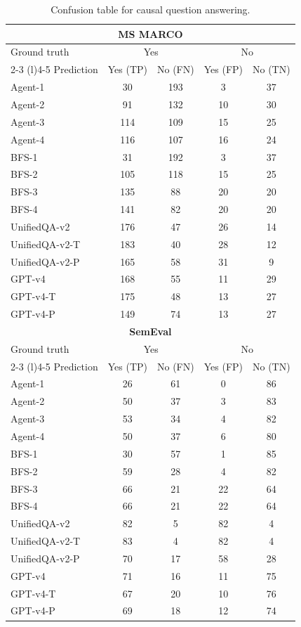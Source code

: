 \begin{table}
\caption{Confusion table for causal question answering.}
\label{table-confusion-table}
\setlength{\tabcolsep}{7pt}
\begin{tabular}{@{}lcccc@{}}
\toprule
\multicolumn{5}{c}{\textbf{MS MARCO}}  \\ \midrule
Ground truth & \multicolumn{2}{c}{Yes} & \multicolumn{2}{c}{No} \\ \cmidrule(lr){2-3} \cmidrule(l){4-5}
Prediction & Yes (TP) & No (FN) & Yes (FP) & No (TN)\\ \midrule
Agent-1         &  30 & 193 &  3 & 37 \\
Agent-2	        &  91 & 132 & 10 & 30 \\
Agent-3	        & 114 & 109 & 15 & 25 \\
Agent-4	        & 116 & 107 & 16 & 24 \\
\midrule
BFS-1           &  31 &  192 &  3 & 37 \\
BFS-2           & 105 &  118 & 15 & 25 \\
BFS-3           & 135 &   88 & 20 & 20 \\
BFS-4           & 141 &   82 & 20 & 20 \\
\midrule
UnifiedQA-v2	& 176 &	 47 & 26 & 14 \\
UnifiedQA-v2-T	& 183 &  40 & 28 & 12 \\
UnifiedQA-v2-P	& 165 &  58 & 31 &  9 \\
GPT-v4          & 168 &  55 & 11 & 29 \\ 
GPT-v4-T        & 175 &  48 & 13 & 27 \\
GPT-v4-P        & 149 &  74 & 13 & 27 \\
\bottomrule
\toprule
\multicolumn{5}{c}{\textbf{SemEval}}\\
\midrule
Ground truth	& \multicolumn{2}{c}{Yes} & \multicolumn{2}{c}{No} \\ \cmidrule(lr){2-3} \cmidrule(l){4-5}
Prediction	& Yes (TP) &	No (FN)	& Yes (FP)	& No (TN) \\ \midrule
Agent-1	       & 26 & 61 &  0 & 86 \\
Agent-2        & 50 & 37 &  3 & 83 \\
Agent-3        & 53 & 34 &  4 & 82 \\
Agent-4        & 50 & 37 &  6 & 80 \\
\midrule
BFS-1          & 30 & 57 &  1 & 85 \\
BFS-2          & 59 & 28 &  4 & 82 \\
BFS-3          & 66 & 21 & 22 & 64 \\
BFS-4          & 66 & 21 & 22 & 64 \\
\midrule
UnifiedQA-v2   & 82 &  5 & 82 &  4 \\
UnifiedQA-v2-T & 83 &  4 & 82 &  4 \\
UnifiedQA-v2-P & 70 & 17 & 58 & 28 \\
GPT-v4         & 71 & 16 & 11 & 75 \\ 
GPT-v4-T       & 67 & 20 & 10 & 76 \\
GPT-v4-P       & 69 & 18 & 12 & 74 \\
\bottomrule
\end{tabular}
\end{table}
